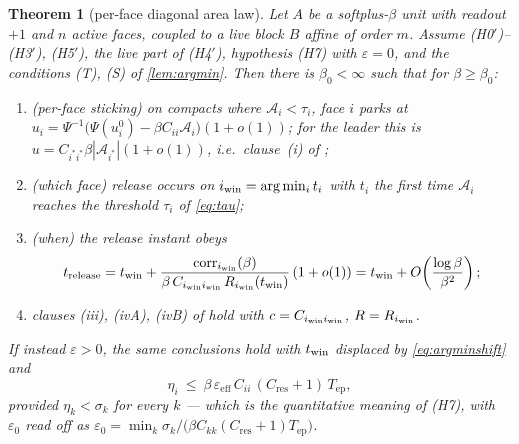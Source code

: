 \documentclass[11pt]{article}
\newtheorem{theorem}{Theorem}
\theoremstyle{remark}
\newcommand{\Ar}{\mathcal{A}}
\newcommand{\Tep}{T_{\mathrm{ep}}}
\newcommand{\Cres}{C_{\mathrm{res}}}
\newcommand{\hyplabel}[1]{\textup{(#1)}}
\begin{document}
\begin{theorem}[per-face diagonal area law]\label{thm:B}
Let $A$ be a softplus-$\beta$ unit with readout $+1$ and $n$ active faces,
coupled to a live block $B$ affine of order $m$. Assume
\hyplabel{H0$'$}--\hyplabel{H3$'$}, \hyplabel{H5$'$}, the live part of
\hyplabel{H4$'$}, hypothesis \hyplabel{H7} with $\varepsilon=0$, and the
conditions \textup{(T)}, \textup{(S)} of \cref{lem:argmin}. Then there is
$\beta_0<\infty$ such that for $\beta\ge\beta_0$:
\begin{enumerate}
\item[(i)] \emph{(per-face sticking)} on compacts where $\Ar_i<\tau_i$, face $i$
parks at $u_i=\Psi^{-1}\bigl(\Psi(u_i^0)-\beta C_{ii}\Ar_i\bigr)(1+o(1))$; for
the leader this is $u=C_{i^\ast i^\ast}\beta|\Ar_{i^\ast}|(1+o(1))$, i.e.\
clause~(i) of \cite[Thm.~6]{paper};
\item[(ii)] \emph{(which face)} release occurs on $i_{\rm win}=\arg\min_it_i$
with $t_i$ the first time $\Ar_i$ reaches the threshold $\tau_i$ of
\eqref{eq:tau};
\item[(iii)] \emph{(when)} the release instant obeys
\begin{equation}\label{eq:relB}
t_{\rm release}
=t_{\rm win}
+\frac{{\rm corr}_{i_{\rm win}}(\beta)}
{\beta\,C_{i_{\rm win}i_{\rm win}}\,R_{i_{\rm win}}(t_{\rm win})}\,(1+o(1))
=t_{\rm win}+O\!\left(\frac{\log\beta}{\beta^2}\right);
\end{equation}
\item[(iv)] clauses \textup{(iii)}, \textup{(ivA)}, \textup{(ivB)} of
\cite[Thm.~6]{paper} hold with $c=C_{i_{\rm win}i_{\rm win}}$,
$R=R_{i_{\rm win}}$.
\end{enumerate}
If instead $\varepsilon>0$, the same conclusions hold with $t_{\rm win}$
displaced by \eqref{eq:argminshift} and
\begin{equation}\label{eq:etaeps}
\eta_i\ \le\ \beta\,\varepsilon_{\mathrm{eff}}\,C_{ii}\,(\Cres+1)\,\Tep ,
\end{equation}
provided $\eta_k<\sigma_k$ for every $k$ --- which is the quantitative meaning
of \hyplabel{H7}, with $\varepsilon_0$ read off as
$\varepsilon_0=\min_k\sigma_k/\bigl(\beta C_{kk}(\Cres+1)\Tep\bigr)$.
\end{theorem}
\end{document}
